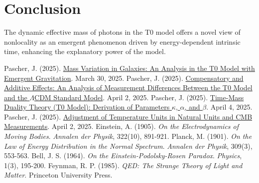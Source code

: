 \documentclass[12pt,a4paper]{article}
\begin{document}
	\section{Conclusion}
	The dynamic effective mass of photons in the T0 model offers a novel view of nonlocality as an emergent phenomenon driven by energy-dependent intrinsic time, enhancing the explanatory power of the model.
	
	\begin{thebibliography}{99}
		 Pascher, J. (2025). \href{https://github.com/jpascher/T0-Time-Mass-Duality/tree/main/2/pdf/English/Massenvariation in Galaxien_en.pdf}{Mass Variation in Galaxies: An Analysis in the T0 Model with Emergent Gravitation}. March 30, 2025.
		 Pascher, J. (2025). \href{https://github.com/jpascher/T0-Time-Mass-Duality/tree/main/2/pdf/English/Analyse der Messdifferenzen zwischen dem T0-Modell und dem Standardmodell_en.pdf}{Compensatory and Additive Effects: An Analysis of Measurement Differences Between the T0 Model and the \(\Lambda\)CDM Standard Model}. April 2, 2025.
		 Pascher, J. (2025). \href{https://github.com/jpascher/T0-Time-Mass-Duality/tree/main/2/pdf/English/Zeit-Masse-Dualitätstheorie (T0-Modell) Herleitung der Parameter kappa, alpha und beta_en.pdf}{Time-Mass Duality Theory (T0 Model): Derivation of Parameters \(\kappa\), \(\alpha\), and \(\beta\)}. April 4, 2025.
		 Pascher, J. (2025). \href{https://github.com/jpascher/T0-Time-Mass-Duality/tree/main/2/pdf/English/Anpassung von Temperatureinheiten in natürlichen Einheiten und CMB-Messungen_en.pdf}{Adjustment of Temperature Units in Natural Units and CMB Measurements}. April 2, 2025.
		 Einstein, A. (1905). \textit{On the Electrodynamics of Moving Bodies}. \textit{Annalen der Physik}, 322(10), 891-921.
		 Planck, M. (1901). \textit{On the Law of Energy Distribution in the Normal Spectrum}. \textit{Annalen der Physik}, 309(3), 553-563.
		 Bell, J. S. (1964). \textit{On the Einstein-Podolsky-Rosen Paradox}. \textit{Physics}, 1(3), 195-200.
		 Feynman, R. P. (1985). \textit{QED: The Strange Theory of Light and Matter}. Princeton University Press.
	\end{thebibliography}
	
\end{document}
